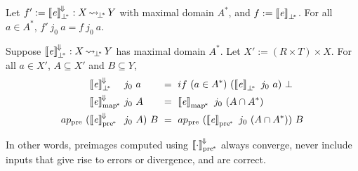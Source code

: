 \documentclass[preprint]{sigplanconf}
\newcommand{\arrow}{\rightsquigarrow}
\newcommand{\conv}{^{\mspace{-2mu}\Downarrow\mspace{-2mu}}}
\newcommand{\meaningofconv}[1]{\left\llbracket{#1}\right\rrbracket\conv}
\newcommand{\pre}{_\mathrm{pre}}
\newcommand{\pbot}{{\bot^{\mspace{-4mu}*}}}
\DeclareMathOperator{\pbotto}{\arrow_{\mspace{-3mu}\pbot}}
\newcommand{\pmap}{_\mathrm{map^{\mspace{-2mu}*}}}
\newcommand{\ppre}{_\mathrm{pre^{\mspace{-2mu}*}}}
\begin{document}
\begin{corollary}
Let $f' := \meaningofconv{\mathit{e}}_\pbot : X \pbotto Y$ with maximal domain $A^*$, and $f := \meaningof{\mathit{e}}_\pbot$.
For all $a \in A^*$, $f'~j_0~a = f~j_0~a$.
\end{corollary}


\begin{corollary}
Suppose $\meaningofconv{\mathit{e}}_\pbot : X \pbotto Y$ has maximal domain $A^*$.
Let $X' := (R \times T) \times X$.
For all $a \in X'$, $A \subseteq X'$ and $B \subseteq Y$,
\begin{equation}
\begin{aligned}
	&\meaningofconv{\mathit{e}}_\pbot &&\!\!\!\!j_0~a &&\!\!\!\!= \ if~(a \in A^*)~(\meaningof{\mathit{e}}_\pbot~j_0~a)~\bot \\
	&\meaningofconv{\mathit{e}}\pmap &&\!\!\!\!j_0~A &&\!\!\!\!= \ \meaningof{\mathit{e}}\pmap~j_0~(A \i A^*) \\
	ap\pre~(\!&\meaningofconv{\mathit{e}}\ppre &&\!\!\!\!j_0~A)~B &&\!\!\!\!= \ ap\pre~(\meaningof{\mathit{e}}\ppre~j_0~(A \i A^*))~B
\end{aligned}
\end{equation}
\label{cor:correct-convergence}
\end{corollary}

In other words, preimages computed using $\meaningofconv{\cdot}\ppre$ always converge, never include inputs that give rise to errors or divergence, and are correct.
\end{document}
